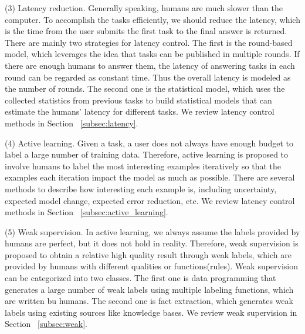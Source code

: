 (3) Latency reduction. Generally speaking, humans are much slower than the computer. To accomplish the tasks efficiently, we should reduce the latency, which is the time from the user submits the first task to the final answer is returned.  There are mainly two strategies for latency control.  The first is the round-based model, which leverages the idea that tasks can be published in multiple rounds. If there are enough humans to answer them, the latency of answering tasks in each round can be regarded as constant time. Thus the overall latency is modeled as the number of rounds. The second one is the statistical model, which uses  the collected statistics from previous  tasks to build statistical models that can estimate  the humans’ latency for different tasks. We review latency control methods in Section ~\ref{subsec:latency}.


(4) Active learning.  Given a task, a user does not always have enough budget to label a large number of training data. Therefore, 
active learning is proposed to  involve humans to label the most interesting examples iteratively so that the examples each iteration impact the model as much as possible. There are several methods to describe how interesting each example is, including uncertainty, expected model change, expected error reduction, etc.   We review latency control methods in Section ~\ref{subsec:active_learning}.


(5) Weak supervision. In active learning, we always assume the labels provided by humans are perfect, but it does not hold in reality. Therefore, weak supervision is proposed to obtain a relative high quality result through weak labels, which are provided by humans with different qualities or functions(rules).  Weak supervision can be categorized into two classes. The first one is data programming that generates a large number of weak labels using multiple labeling functions, which are written bu humans. The second one is fact extraction, which generates weak labels using existing sources like knowledge bases. We review weak supervision  in Section ~\ref{subsec:weak}.

